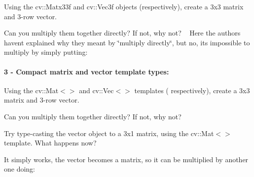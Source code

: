 \begin{DoxyEnumerate}
\item Using the {\ttfamily cv\+::\+Matx33f} and {\ttfamily cv\+::\+Vec3f} objects (respectively), create a 3x3 matrix and 3-\/row vector. 
\begin{DoxyCodeInclude}
\end{DoxyCodeInclude}

\item Can you multiply them together directly? If not, why not? ~\newline
 Here the authors haven\textquotesingle{}t explained why they meant by \char`\"{}multiply directly\char`\"{}, but no, it\textquotesingle{}s impossible to multiply by simply putting\+: 
\begin{DoxyCodeInclude}
\end{DoxyCodeInclude}
 \paragraph*{3 -\/ Compact matrix and vector template types\+:}
\end{DoxyEnumerate}


\begin{DoxyEnumerate}
\item Using the {\ttfamily cv\+::\+Mat$<$$>$} and {\ttfamily cv\+::\+Vec$<$$>$} templates ( respectively), create a 3x3 matrix and 3-\/row vector. 
\begin{DoxyCodeInclude}
\end{DoxyCodeInclude}

\item Can you multiply them together directly? If not, why not? 
\begin{DoxyCodeInclude}
\end{DoxyCodeInclude}

\item Try type-\/casting the vector object to a 3x1 matrix, using the {\ttfamily cv\+::\+Mat$<$$>$} template. What happens now? 
\begin{DoxyCodeInclude}
\end{DoxyCodeInclude}
It simply works, the vector becomes a matrix, so it can be multiplied by another one doing\+: 
\begin{DoxyCodeInclude}
\end{DoxyCodeInclude}

\end{DoxyEnumerate}